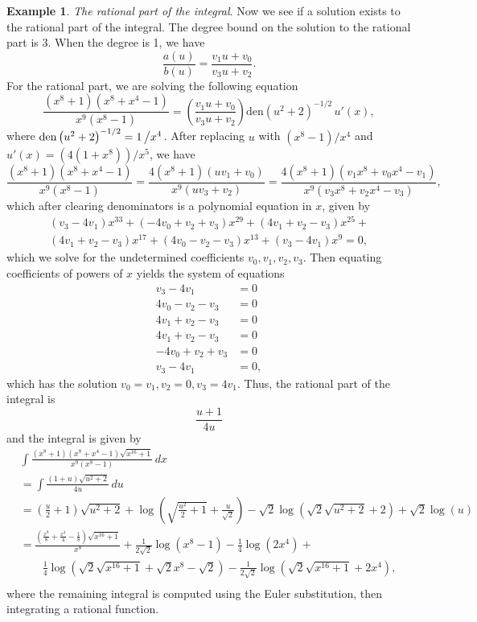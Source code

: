 \documentclass[12pt]{article}
\numberwithin{equation}{section}
\theoremstyle{definition}
\newtheorem{example}{Example}[section]
\begin{document}
\begin{example}
\noindent\textit{The rational part of the integral}. Now we see if a solution exists to the rational part of the 
integral. The degree bound on the solution to the rational part is 3. When the degree is 1, we have
$$\frac{a(u)}{b(u)}=\frac{v_1u+v_0}{v_3u+v_2}.$$
For the rational part, we are solving the following equation
$$\frac{\left(x^8+1\right) \left(x^8+x^4-1\right)}{x^9 \left(x^8-1\right)} =
\left(\frac{v_1u+v_0}{v_3u+v_2}\right)\text{den}\left(u^2+2\right)^{-1/2}\,u'(x),$$
where $\text{den}\left(u^2+2\right)^{-1/2}=1\left/x^4\right.$. After replacing $u$ with 
$\left(x^8-1\right)/x^4$ and $u'(x) = \left(4 \left(1+x^8\right)\right)/x^5$, we have
$$\frac{\left(x^8+1\right) \left(x^8+x^4-1\right)}{x^9 \left(x^8-1\right)} = 
\frac{4 \left(x^8+1\right) \left(u v_1+v_0\right)}{x^9 \left(u v_3+v_2\right)} = 
\frac{4\left(x^8+1\right) \left(v_1 x^8+v_0 x^4-v_1\right)}{x^9 \left(v_3 x^8+v_2 x^4-v_3\right)},$$
which after clearing denominators is a polynomial equation in $x$, given by
\begin{multline*}
\left(v_3-4 v_1\right) x^{33}+\left(-4 v_0+v_2+v_3\right) x^{29}+\left(4 v_1+v_2-v_3\right) x^{25}+\\
\left(4 v_1+v_2-v_3\right) x^{17}+\left(4 v_0-v_2-v_3\right) x^{13}+\left(v_3-4 v_1\right) x^9 = 0,
\end{multline*}
which we solve for the undetermined coefficients $v_0,v_1,v_2,v_3$. Then equating coefficients of 
powers of $x$ yields the system of equations
\begin{align*}
 v_3-4 v_1&=0 \\
 4 v_0-v_2-v_3&=0 \\
 4 v_1+v_2-v_3&=0 \\
 4 v_1+v_2-v_3&=0 \\
 -4 v_0+v_2+v_3&=0 \\
 v_3-4 v_1&=0,
\end{align*}
which has the solution $v_0=v_1,v_2=0,v_3=4v_1$. Thus, the rational part of the integral is
$$\frac{u+1}{4u}$$
and the integral is given by
\begin{align*}
&\int \frac{\left(x^8+1\right) \left(x^8+x^4-1\right) \sqrt{x^{16}+1}}{x^9 \left(x^8-1\right)} \, dx\\
&=\int \frac{(1+u) \sqrt{u^2+2}}{4 u} \, du\\
&=\left(\frac{u}{2}+1\right)\sqrt{u^2+2}+\log \left(\sqrt{\frac{u^2}{2}+1}+\frac{u}{\sqrt{2}}\right)-
\sqrt{2} \log \left(\sqrt{2} \sqrt{u^2+2}+2\right)+\sqrt{2}\log (u)\\
&=\frac{\left(\frac{x^8}{8}+\frac{x^4}{4}-\frac{1}{8}\right) \sqrt{x^{16}+1}}{x^8} + 
	\frac{1}{2\sqrt{2}}\log\left(x^8-1\right) - \frac{1}{4} \log \left(2 x^4\right) + \\
&\qquad \frac{1}{4} \log \left(\sqrt{2}\sqrt{x^{16}+1}+\sqrt{2}x^8-\sqrt{2}\right)-
	\frac{1}{2 \sqrt{2}}\log \left(\sqrt{2}\sqrt{x^{16}+1}+2 x^4\right),\\
\end{align*}
where the remaining integral is computed using the Euler substitution, then integrating a  
rational function. 
\end{example}
\fi
\end{document}
